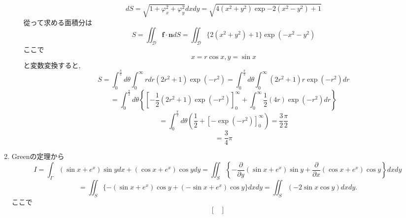 \documentclass[a4paper,10pt,report]{amsart}
\theoremstyle{plain}
\theoremstyle{definition}
\theoremstyle{remark}
\begin{document}
\begin{enumerate}
\begin{enumerate}
\begin{equation*}
                dS=\sqrt{1+\varphi_{x}^{2}+\varphi_{y}^{2}}dxdy=\sqrt{4(x^{2}+y^{2})\exp{-2(x^{2}-y^{2})}+1}
            \end{equation*}
            從って求める面積分は
            \begin{equation*}
            S=\iint_{\mathcal{D}}\bm{f}\cdot\bm{n}dS=\iint_{\mathcal{D}}\{2(x^{2}+y^{2})+1\}\exp(-x^{2}-y^{2})
            \end{equation*}
            ここで
            \begin{equation*}
                x=r\cos{x},y=\sin{x}
            \end{equation*}
            と変数変換すると, 
            \begin{equation*}
                S=\int_{0}^{\frac{\pi}{2}}d\theta\int_{0}^{\infty}rdr(2r^{2}+1)\exp{(-r^{2})}=\int_{0}^{\frac{\pi}{2}}d\theta\int_{0}^{\infty}(2r^{2}+1)r\exp(-r^{2})dr
            \end{equation*}
            \begin{equation*}
                =\int_{0}^{\frac{\pi}{2}}d\theta\left\{{\left[-\frac{1}{2}(2r^{2}+1)\exp(-r^{2})\right]}_{0}^{\infty}+\int_{0}^{\infty}\frac{1}{2}(4r)\exp(-r^{2})dr\right\}
            \end{equation*}
            \begin{equation*}
                =\int_{0}^{\frac{\pi}{2}}d\theta\left(\frac{1}{2}+{[-\exp(-r^{2})]}_{0}^{\infty}\right)=\frac{3}{2}\frac{\pi}{2}
            \end{equation*}
            \begin{equation*}
                =\frac{3}{4}\pi
            \end{equation*}
        \end{enumerate}
        \item Greenの定理から
        \begin{equation*}
            I=\int_{\Gamma}(\sin{x}+e^{x})\sin{y}dx+(\cos{x}+e^{x})\cos{y}dy=\iint_{S}\left \{-\frac{\partial}{\partial y}(\sin{x}+e^{x})\sin{y}+\frac{\partial}{\partial x}(\cos{x}+e^{x})\cos{y}\right \}dxdy
        \end{equation*}
        \begin{equation*}
            =\iint_{S}\{-(\sin{x}+e^{x})\cos{y}+(-\sin{x}+e^{x})\cos{y}\}dxdy=\iint_{S}(-2\sin{x}\cos{y})dxdy. 
        \end{equation*}
        ここで
        \begin{equation*}
            \begin{bmatrix}

\end{bmatrix}
\end{equation*}
\end{enumerate}
\end{document}
